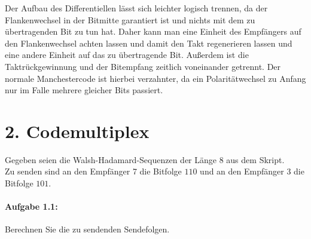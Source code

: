     Der Aufbau des Differentiellen lässt sich leichter logisch trennen, da der
    Flankenwechsel in der Bitmitte garantiert ist und nichts mit dem zu
    übertragenden Bit zu tun hat. Daher kann man eine Einheit des Empfängers auf
    den Flankenwechsel achten lassen und damit den Takt regenerieren lassen und
    eine andere Einheit auf das zu übertragende Bit. Außerdem ist die
    Taktrückgewinnung und der Bitempfang zeitlich voneinander getrennt. Der
    normale Manchestercode ist hierbei verzahnter, da ein Polaritätwechsel zu 
    Anfang nur im Falle mehrere gleicher Bits passiert.

\section{2. Codemultiplex}
Gegeben seien die Walsh-Hadamard-Sequenzen der Länge 8 aus dem Skript.\\
Zu senden sind an den Empfänger 7 die Bitfolge $110$ und an den Empfänger 3 die Bitfolge $101$.
\paragraph{Aufgabe 1.1:}
	Berechnen Sie die zu sendenden Sendefolgen.

